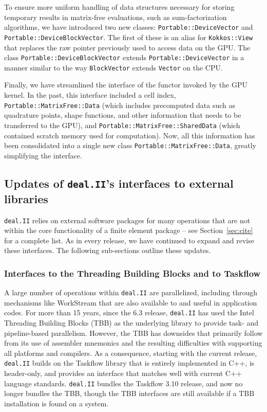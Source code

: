 \documentclass{ansarticle-preprint}
\newcommand{\specialword}[1]{\texttt{#1}}
\newcommand{\dealii}{{\specialword{deal.II}}\xspace}
\begin{document}
To ensure more uniform handling of data structures necessary for
storing temporary results in matrix-free evaluations, such as
sum-factorization algorithms, we have introduced two new classes:
\texttt{Portable::DeviceVector} and
\texttt{Portable::DeviceBlockVector}. The first of these is an
alias for \texttt{Kokkos::View} that replaces the raw pointer previously used
to access data on the GPU. The class \texttt{Portable::DeviceBlockVector} extends
\texttt{Portable::DeviceVector} in a manner similar to the way
\texttt{BlockVector} extends \texttt{Vector} on the CPU.

Finally, we have streamlined the interface of the functor invoked by the GPU
kernel. In the past, this interface included a cell index,
\texttt{Portable::MatrixFree::Data} (which includes precomputed data such as
quadrature points, shape functions, and other information that needs to be
transferred to the GPU), and \texttt{Portable::MatrixFree::SharedData} (which
contained scratch memory used for computation). Now, all this information has
been consolidated into a single new class
\texttt{Portable::MatrixFree::Data}, greatly simplifying the interface.


\subsection{Updates of \dealii{}'s interfaces to external libraries}
\label{subsec:external}

\dealii{} relies on external software packages for many operations
that are not within the core functionality of a finite element package
-- see Section~\ref{sec:cite} for a complete list. As in every
release, we have continued to expand and revise these interfaces. The
following sub-sections outline these updates.

\subsubsection{Interfaces to the Threading Building Blocks and to
  Taskflow}

A large number of operations within \dealii{} are parallelized,
including through mechanisms like WorkStream \cite{TKB16} that are
also available to and useful in application codes. For more than
15 years, since the 6.3 release, \dealii{} has used the Intel Threading
Building Blocks (TBB) \cite{reinders2007tbb} as the underlying library to
provide task- and pipeline-based parallelism. However, the TBB has
downsides that primarily follow from its use of assembler mnemonics
and the resulting difficulties with supporting all platforms and
compilers. As a consequence, starting with the current release,
\dealii{} builds on the Taskflow library \cite{huang2021taskflow} that
is entirely implemented in C++, is header-only, and provides an
interface that matches well with current C++ language standards. \dealii{}
bundles the Taskflow 3.10 release, and now no longer bundles the TBB,
though the TBB interfaces are still available if a TBB installation
is found on a system.
\end{document}
